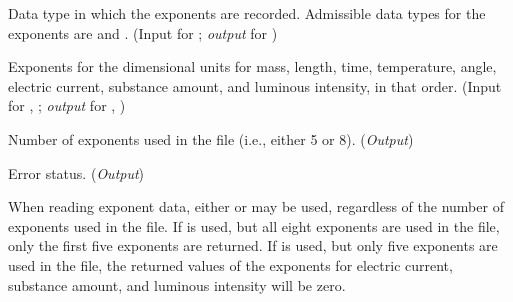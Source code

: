 \begin{Ventryi}{}\raggedright
\item [\fort{DataType}]
      Data type in which the exponents are recorded.
      Admissible data types for the exponents are 
      and .
      (\textcolor{input}{Input} for ;
      \textcolor{output}{\textit{output}} for )
\item [\fort{exponents}]
      Exponents for the dimensional units for mass, length, time,
      temperature, angle, electric current, substance amount, and
      luminous intensity, in that order.
      (\textcolor{input}{Input} for ,
      ;
      \textcolor{output}{\textit{output}} for ,
      )
\item [\fort{nexponents}]
      Number of exponents used in the file (i.e., either 5 or 8).
      (\textcolor{output}{\textit{Output}})
\item [\fort{ier}]
      Error status.
      (\textcolor{output}{\textit{Output}})
\end{Ventryi}

When reading exponent data, either  or
 may be used, regardless of the number of
exponents used in the file.
If  is used, but all eight exponents are used
in the file, only the first five exponents are returned.
If  is used, but only five exponents are used
in the file, the returned values of the exponents for electric current,
substance amount, and luminous intensity will be zero.
